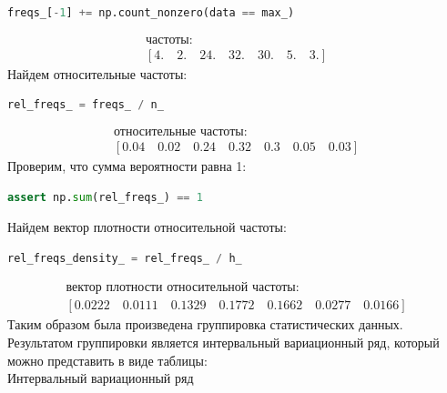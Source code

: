 \documentclass[a4paper, 14pt]{extarticle}
\begin{document}
\begin{itemize}
\begin{center}
\begin{lstlisting}[language=Python]
freqs_[-1] += np.count_nonzero(data == max_)
        \end{lstlisting}
    \end{center}
    \vspace{-15pt}
    \begin{gather*}
        \text{частоты}: \\
        [4. \quad  2. \quad 24. \quad 32. \quad 30.  \quad 5.  \quad 3.]
    \end{gather*}
    Найдем относительные частоты:
    \begin{center}
        \begin{lstlisting}[language=Python]
rel_freqs_ = freqs_ / n_
        \end{lstlisting}
    \end{center}
    \vspace{-15pt}
    \begin{gather*}
        \text{относительные частоты}: \\
        [0.04 \quad 0.02 \quad 0.24 \quad 0.32 \quad 0.3  \quad 0.05 \quad 0.03]
    \end{gather*}
    Проверим, что сумма вероятности равна 1:
    \begin{center}
        \begin{lstlisting}[language=Python]
assert np.sum(rel_freqs_) == 1
        \end{lstlisting}
    \end{center}
    \vspace{-15pt}
    Найдем вектор плотности относительной частоты:
    \begin{center}
        \begin{lstlisting}[language=Python]
rel_freqs_density_ = rel_freqs_ / h_
        \end{lstlisting}
    \end{center}
    \vspace{-15pt}
    \begin{gather*}
        \text{вектор плотности относительной частоты}: \\
        [0.0222 \quad 0.0111 \quad 0.1329 \quad 0.1772 \quad 0.1662 \quad 0.0277 \quad 0.0166]
    \end{gather*}
    Таким образом была произведена группировка статистических данных. 
    Результатом группировки является интервальный вариационный ряд, 
    который можно представить в виде таблицы:\\

    \hspace{-32.5pt}\hrulefill Интервальный вариационный ряд\hrulefill


\end{itemize}
\end{document}
